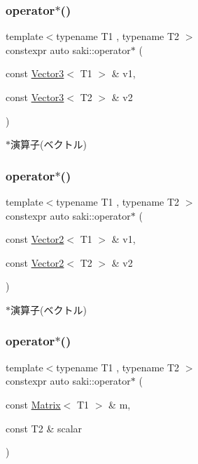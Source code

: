 \subsubsection{\texorpdfstring{operator$\ast$()}{operator*()}\hspace{0.1cm}{\footnotesize\ttfamily [10/14]}}
{\footnotesize\ttfamily template$<$typename T1 , typename T2 $>$ \\
constexpr auto saki\+::operator$\ast$ (\begin{DoxyParamCaption}\item[{const \mbox{\hyperlink{classsaki_1_1_vector3}{Vector3}}$<$ T1 $>$ \&}]{v1,  }\item[{const \mbox{\hyperlink{classsaki_1_1_vector3}{Vector3}}$<$ T2 $>$ \&}]{v2 }\end{DoxyParamCaption})}



$\ast$演算子(ベクトル) 

\mbox{\label{namespacesaki_aa99ace9b4d1710c38d180a75514e748f}} 
\subsubsection{\texorpdfstring{operator$\ast$()}{operator*()}\hspace{0.1cm}{\footnotesize\ttfamily [11/14]}}
{\footnotesize\ttfamily template$<$typename T1 , typename T2 $>$ \\
constexpr auto saki\+::operator$\ast$ (\begin{DoxyParamCaption}\item[{const \mbox{\hyperlink{classsaki_1_1_vector2}{Vector2}}$<$ T1 $>$ \&}]{v1,  }\item[{const \mbox{\hyperlink{classsaki_1_1_vector2}{Vector2}}$<$ T2 $>$ \&}]{v2 }\end{DoxyParamCaption})}



$\ast$演算子(ベクトル) 

\mbox{\label{namespacesaki_ad348e50faa98837b804c503c3198afc3}} 
\subsubsection{\texorpdfstring{operator$\ast$()}{operator*()}\hspace{0.1cm}{\footnotesize\ttfamily [12/14]}}
{\footnotesize\ttfamily template$<$typename T1 , typename T2 $>$ \\
constexpr auto saki\+::operator$\ast$ (\begin{DoxyParamCaption}\item[{const \mbox{\hyperlink{classsaki_1_1_matrix}{Matrix}}$<$ T1 $>$ \&}]{m,  }\item[{const T2 \&}]{scalar }\end{DoxyParamCaption})}




